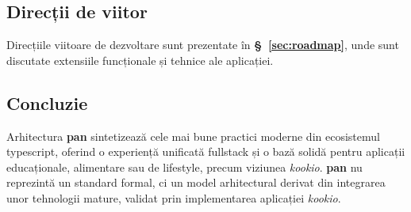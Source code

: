 \subsection{Direcții de viitor}
Direcțiile viitoare de dezvoltare sunt prezentate în \textbf{§~\ref{sec:roadmap}}, unde sunt discutate extensiile funcționale și tehnice ale aplicației.

\subsection{Concluzie}
Arhitectura \textbf{\gls{pan}} sintetizează cele mai bune practici moderne din ecosistemul \gls{typescript}, oferind o experiență unificată \gls{fullstack} și o bază solidă pentru aplicații educaționale, alimentare sau de lifestyle, precum viziunea \textit{\gls{kookio}}.
\textbf{\gls{pan}} nu reprezintă un standard formal, ci un model arhitectural derivat din integrarea unor tehnologii mature, validat prin implementarea aplicației \textit{\gls{kookio}}.
